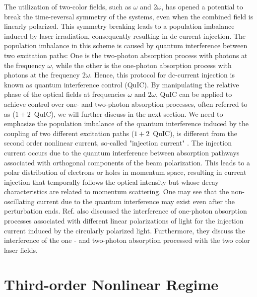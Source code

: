 The utilization of two-color fields, such as  $\omega$ and  $2\omega$, has opened a potential to
break the time-reversal symmetry of the systems, even when the combined field is linearly
polarized. This symmetry breaking leads to a population imbalance induced by laser irradiation,
consequently resulting in dc-current injection. The population imbalance in this scheme is caused
by quantum interference between two excitation paths: One is the two-photon absorption process with
photons at the frequency  $\omega$, while the other is the one-photon absorption process with
photons at the frequency  $2\omega$. Hence, this protocol for dc-current injection is known as
quantum interference control (\gls{QuIC}). By manipulating the relative phase of the optical fields
at frequencies  $\omega$ and $2\omega$, \gls{QuIC} can be applied to achieve control over one- and
two-photon absorption processes, often referred to as ($1+2$~QuIC), we will further discuss in the
next section.
\color{red}
We need to emphasize the population imbalance of the quantum interference induced by the coupling of two different excitation paths ($1+2$~QuIC), is different from the second order nonlinear current, so-called "injection current" \cite{laman2005ultrafast}. The injection current occurs due to the quantum interference between absorption pathways associated with orthogonal components of the beam polarization. This leads to a polar distribution of electrons or holes in momentum space, resulting in current injection that temporally follows the optical intensity but whose decay characteristics are related to momentum scattering\cite{laman2005ultrafast}. One may see that the non-oscillating current due to the quantum interference may exist even after the perturbation ends. Ref.\cite{sipe2000second} also discussed the interference of one-photon absorption processes associated with different linear polarizations of light for the injection current induced by the circularly polarized light. Furthermore,  they discuss the interference of the one - and two-photon absorption processed with the two color laser fields.\\
\color{black}
\section{Third-order Nonlinear Regime \label{sec:perturbative}}

